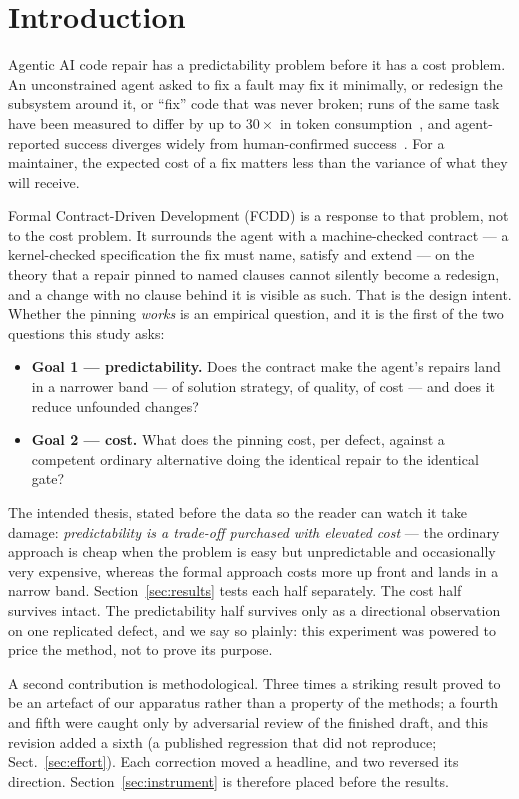 \documentclass[runningheads]{llncs}
\begin{document}
\section{Introduction}

Agentic AI code repair has a predictability problem before it has a cost
problem. An unconstrained agent asked to fix a fault may fix it minimally, or
redesign the subsystem around it, or ``fix'' code that was never broken; runs
of the same task have been measured to differ by up to $30\times$ in token
consumption~\cite{bai2026}, and agent-reported success diverges widely from
human-confirmed success~\cite{rondon2025}. For a maintainer, the expected
cost of a fix matters less than the variance of what they will receive.

Formal Contract-Driven Development (FCDD) is a response to that problem, not
to the cost problem. It surrounds the agent with a machine-checked contract
--- a kernel-checked specification the fix must name, satisfy and extend ---
on the theory that a repair pinned to named clauses cannot silently become a
redesign, and a change with no clause behind it is visible as such. That is
the design intent. Whether the pinning \emph{works} is an empirical question,
and it is the first of the two questions this study asks:

\begin{itemize}
\item \textbf{Goal 1 --- predictability.} Does the contract make the agent's
repairs land in a narrower band --- of solution strategy, of quality, of cost
--- and does it reduce unfounded changes?
\item \textbf{Goal 2 --- cost.} What does the pinning cost, per defect,
against a competent ordinary alternative doing the identical repair to the
identical gate?
\end{itemize}

The intended thesis, stated before the data so the reader can watch it take
damage: \emph{predictability is a trade-off purchased with elevated cost} ---
the ordinary approach is cheap when the problem is easy but unpredictable and
occasionally very expensive, whereas the formal approach costs more up front
and lands in a narrow band. Section~\ref{sec:results} tests each half
separately. The cost half survives intact. The predictability half survives
only as a directional observation on one replicated defect, and we say so
plainly: this experiment was powered to price the method, not to prove its
purpose.

A second contribution is methodological. Three times a striking result proved
to be an artefact of our apparatus rather than a property of the methods; a
fourth and fifth were caught only by adversarial review of the finished
draft, and this revision added a sixth (a published regression that did not
reproduce; Sect.~\ref{sec:effort}). Each correction moved a headline, and two
reversed its direction. Section~\ref{sec:instrument} is therefore placed
before the results.
\end{document}

